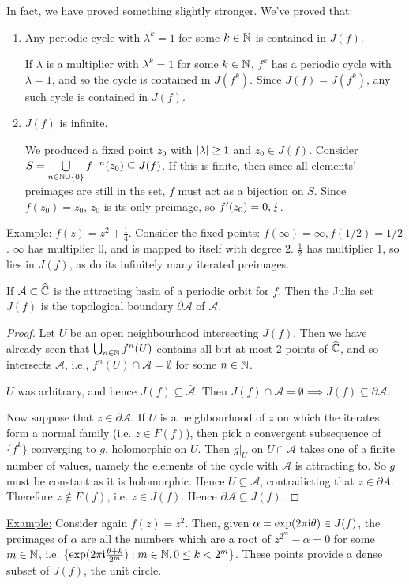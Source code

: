 \documentclass[10pt,a4paper]{article}
\begin{document}
In fact, we have proved something slightly stronger. We've proved that:
\begin{enumerate}
  \item Any periodic cycle with $\lambda^k = 1$ for some $k\in \mathbb{N}$ is contained in $J(f)$.

  If $\lambda$ is a multiplier with $\lambda^k = 1$ for some $k \in \mathbb{N}$, $f^k$ has a periodic cycle with $\lambda = 1$, and so the cycle is contained in $J(f^k)$. Since $J(f) = J(f^k)$, any such cycle is contained in $J(f)$.
  \item $J(f)$ is infinite.

  We produced a fixed point $z_0$ with $\lvert\lambda\rvert \geq 1$ and $z_0 \in J(f)$. Consider $S = \bigcup\limits_{n \in \mathbb{N}\cup\{0\}}f^{-n}(z_0)\subseteq J(f)$. If this is finite, then since all elements' preimages are still in the set, $f$ must act as a bijection on $S$. Since $f(z_0) = z_0$, $z_0$ is its only preimage, so $f'(z_0) = 0, \lightning$.
\end{enumerate}
\underline{Example:} $f(z) = z^2+\frac{1}{4}$. Consider the fixed points: $f(\infty) = \infty, f(1/2) = 1/2$. $\infty$ has multiplier 0, and is mapped to itself with degree $2$. $\frac{1}{2}$ has multiplier 1, so lies in $J(f)$, as do its infinitely many iterated preimages.

\begin{proposition}
  If $\mathcal{A}\subset \widehat{\mathbb{C}}$ is the attracting basin of a periodic orbit for $f$. Then the Julia set $J(f)$ is the topological boundary $\partial \mathcal{A}$ of $\mathcal{A}$.
\end{proposition}
\begin{proof}
  Let $U$ be an open neighbourhood intersecting $J(f)$. Then we have already seen that $\bigcup_{n \in \mathbb{N}} f^{n}(U)$ contains all but at most 2 points of $\widehat{\mathbb{C}}$, and so intersects $\mathcal{A}$, i.e., $f^n(U) \cap \mathcal{A} = \emptyset$ for some $n \in \mathbb{N}$.

  $U$ was arbitrary, and hence $J(f) \subseteq \bar{\mathcal{A}}$. Then $J(f) \cap \mathcal{A} = \emptyset \implies J(f)\subseteq \partial\mathcal{A}$.

  Now suppose that $z \in \partial \mathcal{A}$. If $U$ is a neighbourhood of $z$ on which the iterates form a normal family (i.e. $z \in F(f)$), then pick a convergent subsequence of $\{f^k\}$ converging to $g$, holomorphic on $U$. Then $g|_U$ on $U \cap \mathcal{A}$ takes one of a finite number of values, namely the elements of the cycle with $\mathcal{A}$ is attracting to. So $g$ must be constant as it is holomorphic. Hence $U \subseteq \mathcal{A}$, contradicting that $z \in \partial A$. Therefore $z \notin F(f)$, i.e. $z \in J(f)$. Hence $\partial \mathcal{A} \subseteq J(f)$.
\end{proof}
\underline{Example:} Consider again $f(z) = z^2$. Then, given $\alpha = \exp(2\pi\mathfrak{i} \theta)\in J(f)$, the preimages of $\alpha$ are all the numbers which are a root of $z^{2^m} -\alpha = 0$ for some $m \in \mathbb{N}$, i.e. $\{\exp(2\pi\mathfrak{i} \frac{\theta + k}{2^m}): m \in \mathbb{N}, 0\leq k<2^m\}$. These points provide a dense subset of $J(f)$, the unit circle.
\end{document}
